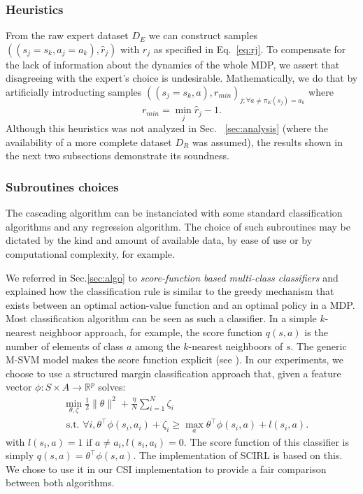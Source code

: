 \documentclass[smallextended]{svjour3}
\begin{document}
\subsubsection{Heuristics}
\label{subsubsec:heuristics}
From the raw expert dataset $D_E$ we can construct samples $((s_j=s_k,a_j=a_k),\hat r_j)$ with $\hat r_j$ as specified in Eq.~\ref{eq:rj}. To compensate for the lack of information about the dynamics of the whole MDP, we assert that disagreeing with the expert's choice is undesirable. Mathematically, we do that by artificially introducting samples $((s_j=s_k,a),r_{min})_{j;\forall a\neq \pi_E(s_j) = a_k}$ where
\begin{equation}
  r_{min} = \min_j\hat r_j - 1.
\end{equation}
Although this heuristics was not analyzed in Sec.~ \ref{sec:analysis} (where the availability of a more complete dataset $D_R$ was assumed), the results shown in the next two subsections demonstrate its soundness.
\subsubsection{Subroutines choices}
\label{subsubsec:subroutines}
The cascading algorithm can be instanciated with some standard classification algorithms and any regression algorithm. The choice of such subroutines may be dictated by the kind and amount of available data, by ease of use or by computational complexity, for example.

We referred in Sec.\ref{sec:algo} to \emph{score-function based multi-class classifiers} and explained how the classification rule is similar to the greedy mechanism that exists between an optimal action-value function and an optimal policy in a MDP. Most classification algorithm can be seen as such a classifier. In a simple $k$-nearest neighboor approach, for example, the score function $q(s,a)$ is the number of elements of class $a$ among the $k$-nearest neighboors of $s$. The generic M-SVM model makes the score function explicit (see \cite{guermeur2011generic}). In our experiments, we choose to use a structured margin classification approach \cite{taskar2005learning} that, given a feature vector $\phi : S\times A \rightarrow \mathbb{R}^p$ solves:
\begin{eqnarray*}
  &\min_{\theta,\zeta}\frac{1}{2}\|\theta\|^2 +
  \frac{\eta}{N}\sum_{i=1}^N \zeta_i \\
  &\text{~s.t.~} \forall i,
  \theta^\top{\phi}(s_i,a_i)+\zeta_i \geq \max_a \theta^\top
  {\phi}(s_i,a) + l(s_i,a). \label{eq:qp_taskar}
\end{eqnarray*}
with $l(s_i,a) = 1\textrm{ if } a\neq a_i,l(s_i,a_i)=0$. The score function of this classifier is simply $q(s,a) = \theta^\top \phi(s,a)$. The implementation of SCIRL \cite{klein2012scirl} is based on this. We chose to use it in our CSI implementation to provide a fair comparison between both algorithms.
\end{document}

